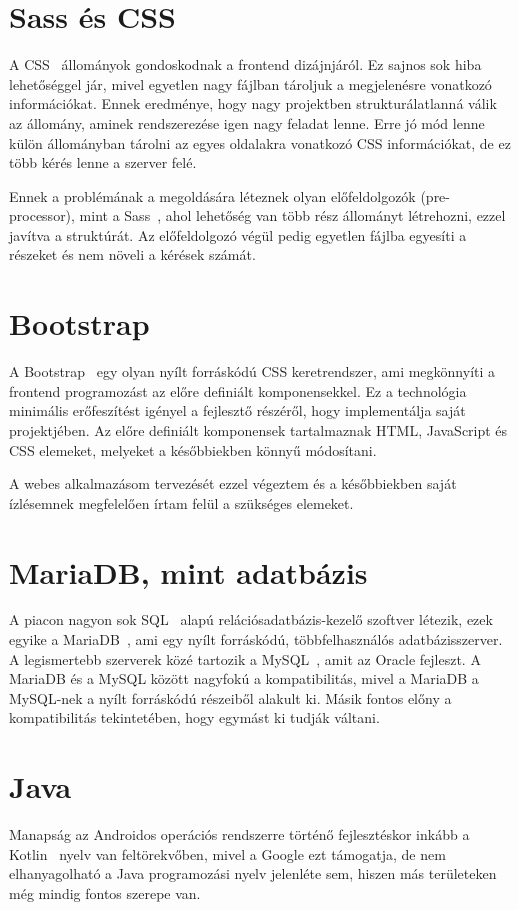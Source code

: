 \documentclass[
]{thesis-ekf}
\theoremstyle{definition}
\theoremstyle{remark}
\begin{document}
	\section{Sass és CSS}
	A CSS~\cite{css_doc} állományok gondoskodnak a frontend dizájnjáról. Ez sajnos sok hiba lehetőséggel jár, mivel egyetlen nagy fájlban tároljuk a megjelenésre vonatkozó információkat. Ennek eredménye, hogy nagy projektben strukturálatlanná válik az állomány, aminek rendszerezése igen nagy feladat lenne. Erre jó mód lenne külön állományban tárolni az egyes oldalakra vonatkozó CSS információkat, de ez több kérés lenne a szerver felé. 
	
	Ennek a problémának a megoldására léteznek olyan előfeldolgozók (pre-processor), mint a Sass~\cite{sass_doc}, ahol lehetőség van több rész állományt létrehozni, ezzel javítva a struktúrát. Az előfeldolgozó végül pedig egyetlen fájlba egyesíti a részeket és nem növeli a kérések számát. 
	
	\section{Bootstrap}
	A Bootstrap~\cite{bootstrap_doc} egy olyan nyílt forráskódú CSS keretrendszer, ami megkönnyíti a frontend programozást az előre definiált komponensekkel. Ez a technológia minimális erőfeszítést igényel a fejlesztő részéről, hogy implementálja saját projektjében. Az előre definiált komponensek tartalmaznak HTML, JavaScript és CSS elemeket, melyeket a későbbiekben könnyű módosítani.
	
	A webes alkalmazásom tervezését ezzel végeztem és a későbbiekben saját ízlésemnek megfelelően írtam felül a szükséges elemeket. 
	
	\section{MariaDB, mint adatbázis}
	A piacon nagyon sok SQL~\cite{sql_book} alapú relációsadatbázis-kezelő szoftver létezik, ezek egyike a MariaDB~\cite{mariadb_doc}, ami egy nyílt forráskódú, többfelhasználós adatbázisszerver. A legismertebb szerverek közé tartozik a MySQL~\cite{mysql_book}, amit az Oracle fejleszt. A MariaDB és a MySQL között nagyfokú a kompatibilitás, mivel a MariaDB a MySQL-nek a nyílt forráskódú részeiből alakult ki. Másik fontos előny a kompatibilitás tekintetében, hogy egymást ki tudják váltani.
	
	\section{Java}
	Manapság az Androidos operációs rendszerre történő fejlesztéskor inkább a Kotlin~\cite{kotlin_book} nyelv van feltörekvőben, mivel a Google ezt támogatja, de nem elhanyagolható a Java programozási nyelv jelenléte sem, hiszen más területeken még mindig fontos szerepe van. 
	
\end{document}
